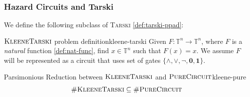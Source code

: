 %
%
%

\subsubsection{Hazard Circuits and Tarski}
We define the following subclass of \textsc{Tarski} \ref{def:tarski-ppad}:


\begin{definitionbox}{$\textnormal{\textsc{KleeneTarski}}$ problem definition}{kleene-tarski}
    Given $F: \mathbb{T}^n \to \mathbb{T}^n$, where $F$ is a \textit{natural} function \ref{def:nat-func},
    find $x \in \mathbb{T}^n$ such that $F(x) = x$.
    We assume $F$ will be represented as a circuit that uses set of gates
    $\{\wedge, \vee, \neg, \mathbf{0}, \mathbf{1}\}$.
\end{definitionbox}

\begin{propositionbox}{Parsimonious Reduction between $\textnormal{\textsc{KleeneTarski}}$ and $\textnormal{\textsc{PureCircuit}}$}{kleene-pure}
    $$
    \textnormal{\textsc{\#KleeneTarski}} \subseteq \textnormal{\textsc{\#PureCircuit}}
    $$
\end{propositionbox}


